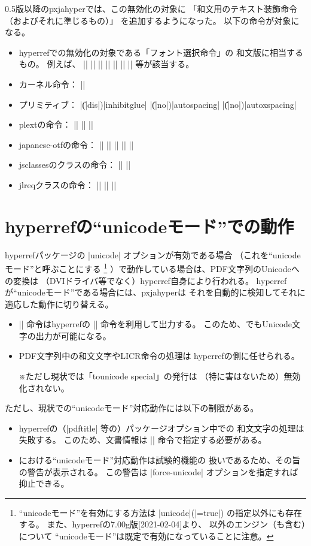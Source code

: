 \documentclass[uplatex,dvipdfmx,a4paper]{jsarticle}
\newcommand{\Pkg}[1]{\textsf{#1}}
\newcommand{\Note}{\par\noindent ※}
\newcommand{\Means}{：\quad}
\providecommand{\Strong}[1]{\textsf{#1}}
\begin{document}
0.5版以降の\Pkg{pxjahyper}では、この無効化の対象に
「和文用のテキスト装飾命令（およびそれに準じるもの）」
を追加するようになった。
以下の命令が対象になる。

\begin{itemize}
\item \Pkg{hyperref}での無効化の対象である「フォント選択命令」の
  和文版に相当するもの。
  例えば、
  |\textmc| |\gtfamily| |\kanjifamily| |\romanshape|
  |\usekanji| |\useroman| |\userelfont|
  等が該当する。
\item {\pLaTeX}カーネル命令\Means
  |\<|
\item {\pTeX}プリミティブ\Means
  |\|(|dis|)|inhibitglue| |\|(|no|)|autospacing| |\|(|no|)|autoxspacing|
\item \Pkg{plext}の命令\Means
  |\bou| |\kasen| |\rensuji|
\item \Pkg{japanese-otf}の命令\Means
  |\textmg| |\mgfamily| |\ltseries| |\ebseries| |\propshape|
\item \Pkg{jsclasses}のクラスの命令\Means
  |\maybeblue| |\HUGE|
\item \Pkg{jlreq}クラスの命令\Means
  |\jafontsize| |\tatechuyoko| |\jidori| %
\end{itemize}

\section{hyperrefの“unicodeモード”での動作}
\newcommand*{\cXAdj}{\mbox{}\vspace*{-2pt}}%

\Pkg{hyperref}パッケージの |unicode| オプションが有効である場合
（これを“unicodeモード”と呼ぶことにする
\footnote{“unicodeモード”を有効にする方法は |unicode|(|=true|)
  の指定以外にも存在する。
  また、\Pkg{hyperref}の7.00g版[2021-02-04]より、
  {\pLaTeX}以外のエンジン（\Strong{{\upLaTeX}も含む}）について
  “unicodeモード”は既定で有効になっていることに注意。}%
）で動作している場合は、PDF文字列のUnicodeへの変換は
（DVIドライバ等でなく）\Pkg{hyperref}自身により行われる。
\Pkg{hyperref}が“unicodeモード”である場合には、\Pkg{pxjahyper}は
それを自動的に検知してそれに適応した動作に切り替える。
\begin{itemize}
\item \cXAdj|\Ux| 命令は\Pkg{hyperref}の |\unichar| 命令を利用して出力する。
  このため、{\pLaTeX}でもUnicode文字の出力が可能になる。
\item PDF文字列中の和文文字やLICR命令の処理は
  \Pkg{hyperref}の側に任せられる。
  \Note ただし現状では「tounicode special」の発行は
  （特に害はないため）無効化されない。
\end{itemize}
ただし、現状での“unicodeモード”対応動作には以下の制限がある。
\begin{itemize}
\item \cXAdj\Pkg{hyperref}の（|pdftitle| 等の）パッケージオプション中での
  和文文字の処理は失敗する。
  このため、文書情報は |\hypersetup| 命令で指定する必要がある。
\item \cXAdj{\pLaTeX}における“unicodeモード”対応動作は試験的機能の
  扱いであるため、その旨の警告が表示される。
  この警告は |force-unicode| オプションを指定すれば抑止できる。
\end{itemize}
\end{document}

